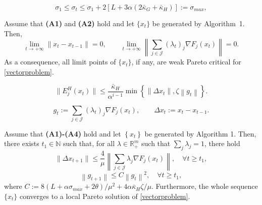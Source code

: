 \documentclass[10pt,a4paper]{amsart}
\newcommand{\J}{\mathcal{J}}
\newcommand{\N}{\mathbb{N}}
\newcommand{\R}{\mathbb{R}}
\begin{document}
\begin{equation}\label{def:sigmaMax}
\sigma_{1}\leq\sigma_{t}\leq \sigma_1+2[L+3\alpha(2\bar \kappa_{G}+\bar \kappa_{H})]:=\sigma_{max},
\end{equation}

\begin{corollary}\label{cor:conv}
Assume that {\bf (A1)} and {\bf (A2)} hold and let $\{x_{t}\}$ be generated by Algorithm~1. Then, 
\begin{equation}
\lim_{t\to+\infty} \|x_t-x_{t-1}\|=0, \qquad \lim_{t\to+\infty}\left \|\sum_{j\in\J}(\lambda_{t})_j\nabla F_j(x_{t})\right\|=0.
\label{eq:3.16}
\end{equation}
As a consequence, all limit points of $\{x_t\}$, if any, are weak Pareto critical for \eqref{vectorproblem}.
\end{corollary}

\begin{equation}
 \|E^H_j(x_t)\|\leq\frac{\bar \kappa_{H}}{\alpha^{i-1}}\min\left\{ \|\Delta x_{t}\|, \zeta\left\|g_t\right\| \right\}.
\label{ineq:ApproxGrad-Hess12}
\end{equation}

\begin{equation}\label{def:gt-Deltaxt}
 g_t:=   \sum_{j\in \J} (\lambda_{t})_j\nabla F_j(x_{t}), \qquad \Delta x_t:=x_t-x_{t-1}.
\end{equation}

\begin{theorem} \label{thm:3.3}
Assume that  {\bf (A1)-(A4)} hold and let $\left\{x_{t}\right\}$ be generated by Algorithm 1. Then, there exists $t_1\in \N$ such that, for all $\lambda \in \R^m_+$ such that $\sum_j\lambda_j=1$, there hold
\begin{equation}\label{eq:Deltaxt-lambdanablaFxt} 
\|\Delta x_{t+1}\|\leq \frac{4}{\mu}\left\|\sum_{j\in \J}\lambda_j \nabla F_j(x_t)\right\|, \quad  \forall t\geq t_1,
\end{equation}
\begin{equation}
\left \|g_{t+1}\right\|\leq C\left\|g_t\right\|^{2},  \quad \forall t\geq t_1,
\label{eq:nablaFxt+1<=nablaFxt}
\end{equation}
where $C:= 8\left(L+\alpha\sigma_{max}+2\theta\right)/\mu^2+4\alpha\bar\kappa_H\zeta/\mu$.
Furthermore, the whole sequence $\{x_t\}$ converges to a local Pareto solution of \eqref{vectorproblem}.
\end{theorem}
\end{document}
